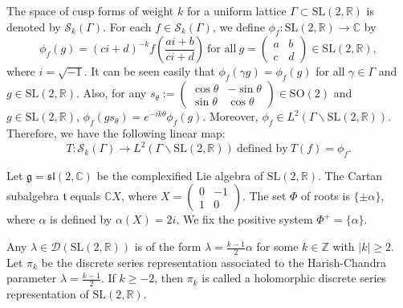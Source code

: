\documentclass[11 pt]{amsart}
\newcommand{\R}{{\mathbb R}}
\newcommand{\Z}{{\mathbb Z}}
\newcommand{\C}{{\mathbb C}}
\theoremstyle{definition}
\numberwithin{equation}{section}
\begin{document}
\noindent The space of cusp forms of weight $k$ for a uniform lattice $\Gamma \subset \mathrm{SL}(2, \R)$ is denoted by $\mathcal{S}_k(\Gamma)$. For each $f \in \mathcal{S}_k(\Gamma)$, we define $\phi_f : \mathrm{SL}(2, \R) \longrightarrow \C$ by 
$$ \phi_f (g) = (ci + d)^{-k} f\left(\dfrac{a i + b}{c i +d}\right)\ \text{for all}\ g=\begin{pmatrix}
a & b\\
c & d
\end{pmatrix} \in \mathrm{SL}(2, \R),$$
where $i= \sqrt{-1}$. 
It can be seen easily that $\phi_f (\gamma g)= \phi_f (g)$ for all $ \gamma \in \Gamma$ and $g \in \mathrm{SL}(2, \R)$. Also, for any $s_{\theta}:=\begin{pmatrix}
\cos \theta & -\sin \theta\\
\sin \theta & \cos \theta
\end{pmatrix} \in \mathrm{SO}(2)$ and $g \in \mathrm{SL}(2, \R)$, $\phi_f (g s_{\theta})= e^{-i k \theta} \phi_f (g)$. Moreover, $\phi_f \in L^2(\Gamma \backslash \mathrm{SL}(2, \R))$. Therefore, we have the following linear map:
$$ T : \mathcal{S}_k(\Gamma) \longrightarrow L^2(\Gamma \backslash \mathrm{SL}(2, \R))\ \text{defined by}\ T(f)=\phi_f.$$

Let $\mathfrak{g}=\mathfrak{sl}(2, \C)$ be the complexified Lie algebra of  $\mathrm{SL}(2, \R)$. The Cartan subalgebra $\mathfrak{t}$ equals $\C X$, where $X=\begin{pmatrix}
    0 & -1\\
    1 & 0
\end{pmatrix}$. The set $\Phi$ of roots is $\{\pm \alpha\}$, where $\alpha$ is defined by $\alpha(X)=2i$. We fix the positive system $\Phi^+=\{\alpha \}$.

\vspace{5pt}

\noindent Any $\lambda \in \mathcal{D}(\mathrm{SL}(2, \R))$ is of the form $\lambda=\tfrac{k-1}{2}\alpha$ for some $k \in \Z$ with $|k| \geq 2$. Let $\pi_k$ be the discrete series representation associated to the Harish-Chandra parameter $\lambda=\tfrac{k-1}{2}$. If $k \geq -2$, then $\pi_k$ is called a holomorphic discrete series representation of $\mathrm{SL}(2, \R)$.
\end{document}
